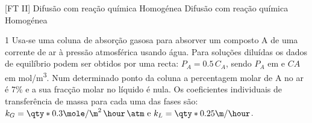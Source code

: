 \documentclass[\mainfilename]{subfiles}
\begin{document}

[FT II]
{Difusão com reação química Homogénea} %
{Difusão com reação química Homogénea} %

\begin{exampleBox}1{ %
    Usa-se uma coluna de absorção gasosa para absorver um composto A de uma corrente de ar à pressão atmosférica usando água. Para soluções diluídas os dados de equilíbrio podem ser obtidos por uma recta: \(P_A = 0.5\,C_A\), sendo \(P_A\) em \unit{\atm} e \(CA\) em \unit{\mol/\m^3}. Num determinado ponto da coluna a percentagem molar de A no ar é 7\% e a sua fracção molar no líquido é nula. Os coeficientes individuais de transferência de massa para cada uma das fases são: \(
        k_G = \qty*{0.3}{\mole/\m^2\,\hour\,\atm}
        \text{ e }
        k_L = \qty*{0.25}{\m/\hour}
    \).
} %
    

\end{exampleBox}
\end{document}
